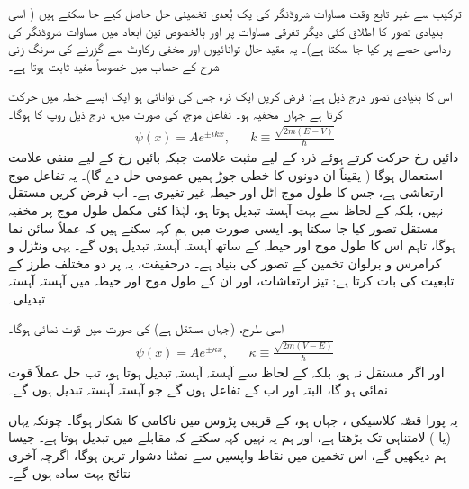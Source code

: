 

 ترکیب سے غیر تابع وقت مساوات شروڈنگر کی یک بُعدی تخمینی حل حاصل کیے جا سکتے ہیں ( اسی بنیادی تصور کا اطلاق کئی دیگر تفرقی مساوات پر اور بالخصوص تین ابعاد میں مساوات شروڈنگر کی رداسی حصے پر کیا جا سکتا ہے)۔ یہ مقید حال توانائیوں اور مخفی رکاوٹ سے گزرنے کی سرنگ زنی شرح کے حساب میں خصوصاً مفید ثابت ہوتا ہے۔

اس کا بنیادی تصور درج ذیل ہے: فرض کریں ایک ذرہ جس کی توانائی  ہو ایک ایسے خطہ میں حرکت کرتا ہے جہاں مخفیہ   ہو۔ تفاعل موج،  کی صورت میں، درج ذیل روپ کا ہوگا۔
\begin{align*}
	\psi(x)=Ae^{\pm ikx}, && k\equiv\frac{\sqrt{2m(E-V)}}{\hslash} 
\end{align*}
دائیں رخ حرکت کرتے ہوئے ذرہ کے لیے مثبت علامت جبکہ بائیں رخ کے لیے منفی علامت استعمال ہوگا ( یقیناً ان دونوں کا خطی جوڑ ہمیں عمومی حل دے گا)۔ یہ تفاعل موج ارتعاشی ہے، جس کا طول موج  اٹل اور حیطہ  غیر تغیری ہے۔ اب فرض کریں  مستقل نہیں، بلکہ  کے لحاظ سے بہت آہستہ تبدیل ہوتا ہو، لہٰذا کئی مکمل طول موج پر مخفیہ مستقل تصور کیا جا سکتا ہو۔ ایسی صورت میں ہم کہہ سکتے ہیں کہ  عملاً سائن نما ہوگا، تاہم اس کا طول موج اور حیطہ  کے ساتھ آہستہ آہستہ تبدیل ہوں گے۔ یہی ونٹزل و کرامرس و برلوان تخمین کے تصور کی بنیاد ہے۔ درحقیقت، یہ  پر دو مختلف طرز کے تابعیت کی بات کرتا ہے: تیز ارتعاشات، اور ان کے طول موج اور حیطہ میں آہستہ آہستہ تبدیلی۔

اسی طرح،  (جہاں  مستقل ہے) کی صورت میں  قوت نمائی ہوگا۔
\begin{align*}
	\psi(x)=Ae^{\pm\kappa x},&& \kappa \equiv\frac{\sqrt{2m(V-E)}}{\hslash} 
\end{align*}
اور اگر  مستقل نہ ہو، بلکہ  کے لحاظ سے آہستہ آہستہ تبدیل ہوتا ہو، تب حل عملاً قوت نمائی ہو گا، البتہ  اور  اب  کے تفاعل ہوں گے جو آہستہ آہستہ تبدیل ہوں گے۔ 

یہ پورا قصّہ کلاسیکی ، جہاں  ہو، کے قریبی پڑوس میں ناکامی کا شکار ہوگا۔ چونکہ یہاں  (یا ) لامتناہی تک بڑھتا ہے، اور ہم یہ نہیں کہہ سکتے کہ  مقابلے میں  تبدیل ہوتا ہے۔ جیسا ہم دیکھیں گے، اس تخمین میں نقاط واپسیں سے نمٹنا دشوار ترین ہوگا، اگرچہ آخری نتائج بہت سادہ ہوں گے۔

